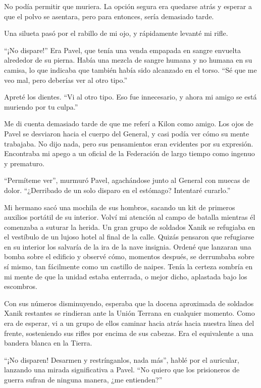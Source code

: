 \documentclass[spanish,12pt,a4paper,oneside,titlepage]{book}
\begin{document}
    No podía permitir que muriera. La opción segura era quedarse atrás y esperar a que el polvo se asentara, pero para entonces, sería demasiado tarde.

    Una silueta pasó por el rabillo de mi ojo, y rápidamente levanté mi rifle.

    ``¡No dispare!'' Era Pavel, que tenía una venda empapada en sangre envuelta alrededor de su pierna. Había una mezcla de sangre humana y no humana en su camisa, lo que indicaba que también había sido alcanzado en el torso. ``Sé que me veo mal, pero deberías ver al otro tipo.''

    Apreté los dientes. ``Vi al otro tipo. Eso fue innecesario, y ahora mi amigo se está muriendo por tu culpa.''

    Me di cuenta demasiado tarde de que me referí a Kilon como amigo. Los ojos de Pavel se desviaron hacia el cuerpo del General, y casi podía ver cómo su mente trabajaba. No dijo nada, pero sus pensamientos eran evidentes por su expresión. Encontraba mi apego a un oficial de la Federación de largo tiempo como ingenuo y prematuro.

    ``Permíteme ver'', murmuró Pavel, agachándose junto al General con muecas de dolor. ``¿Derribado de un solo disparo en el estómago? Intentaré curarlo.''

    Mi hermano sacó una mochila de sus hombros, sacando un kit de primeros auxilios portátil de su interior. Volví mi atención al campo de batalla mientras él comenzaba a suturar la herida. Un gran grupo de soldados Xanik se refugiaba en el vestíbulo de un lujoso hotel al final de la calle. Quizás pensaron que refugiarse en su interior los salvaría de la ira de la nave insignia. Ordené que lanzaran una bomba sobre el edificio y observé cómo, momentos después, se derrumbaba sobre sí mismo, tan fácilmente como un castillo de naipes. Tenía la certeza sombría en mi mente de que la unidad estaba enterrada, o mejor dicho, aplastada bajo los escombros.

    Con sus números disminuyendo, esperaba que la docena aproximada de soldados Xanik restantes se rindieran ante la Unión Terrana en cualquier momento. Como era de esperar, vi a un grupo de ellos caminar hacia atrás hacia nuestra línea del frente, sosteniendo sus rifles por encima de sus cabezas. Era el equivalente a una bandera blanca en la Tierra.

    ``¡No disparen! Desarmen y restrínganlos, nada más'', hablé por el auricular, lanzando una mirada significativa a Pavel. ``No quiero que los prisioneros de guerra sufran de ninguna manera, ¿me entienden?''
\end{document}
